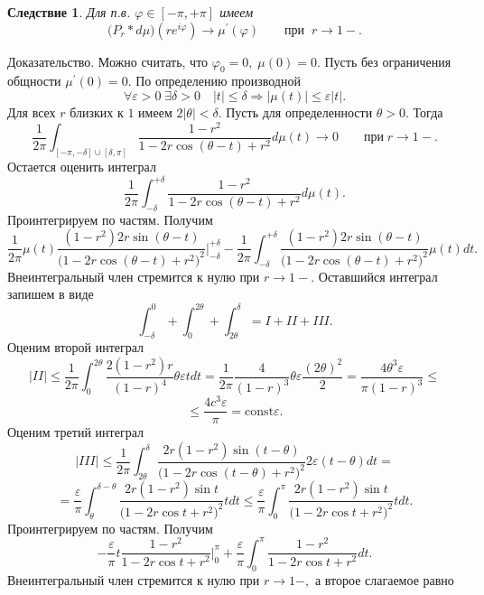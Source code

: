 \documentclass[12pt,a4paper]{article}
\theoremstyle{plain}   \newtheorem{Pro}{Задача}
\newtheorem{Cor}{Следствие}
\begin{document}
\begin{Cor}
Для п.в.
$ \varphi \in [-\pi , +\pi ] $
имеем
$$
  \biggl ( P_r \ast d\mu \biggr )
  (re^{i\varphi}) \longrightarrow
  \mu ^{\prime}(\varphi )
  \qquad при \; \; r \rightarrow 1- .
$$
\end{Cor}
{\Large Доказательство.}
Можно считать, что
$ \varphi _0 =0, \; \mu (0)=0. $
Пусть без ограничения общности
$ \mu ^{\prime}(0)=0. $
По определению производной
$$
  \forall \varepsilon >0 \; \exists \delta >0 \quad
  |t| \leq \delta \Rightarrow
  |\mu (t)| \leq \varepsilon |t|.
$$
Для всех
$ r $
близких к
$ 1 $
имеем
$ 2|\theta |<\delta . $
Пусть для определенности
$ \theta >0. $
Тогда
$$
  \frac{1}{2\pi} \int _{[-\pi , -\delta ] \cup [\delta , \pi]}
  \frac{1-r^2}{1-2r\cos (\theta -t)+r^2}d\mu (t)
  \longrightarrow 0 \qquad при \; r \rightarrow 1-.
$$
Остается оценить интеграл
$$
  \frac{1}{2\pi}\int _{-\delta}^{+\delta}
  \frac{1-r^2}{1-2r\cos (\theta -t)+r^2}d\mu (t).
$$
Проинтегрируем по частям. Получим
$$
  \frac{1}{2\pi}\mu (t)
  \frac{(1-r^2 )2r \sin (\theta -t)}
  {\bigl (1-2r\cos (\theta -t)+r^2 \bigr )^2}
  \Biggr | _{-\delta}^{+\delta}-
  \frac{1}{2\pi}\int _{-\delta}^{+\delta}
  \frac{(1-r^2 )2r \sin (\theta -t)}
  {\bigl (1-2r\cos (\theta -t)+r^2 \bigr )^2}
  \mu (t)dt.
$$
Внеинтегральный член стремится к нулю при
$ r \rightarrow 1- .$
Оставшийся интеграл запишем в виде
$$
  \int _{-\delta}^0 + \int _0 ^{2\theta} +
  \int _{2\theta}^{\delta} = I +II +III.
$$
Оценим второй интеграл
$$
  |II| \leq \frac{1}{2\pi}\int _0 ^{2\theta}
  \frac{2(1-r^2 )r}{(1-r)^4}\theta \varepsilon tdt=
  \frac{1}{2\pi}\frac{4}{(1-r)^3}\theta \varepsilon
  \frac{(2\theta)^2}{2}=
  \frac{4\theta ^3 \varepsilon}{\pi (1-r)^3} \leq
$$
$$
  \leq \frac{4c^3 \varepsilon }{\pi} = \mathrm{const} \varepsilon .
$$
Оценим третий интеграл
$$
  |III| \leq \frac{1}{2\pi} \int _{2\theta}^{\delta}
  \frac{2r(1-r^2 ) \sin (t-\theta )}
  {\bigl ( 1-2r \cos (t-\theta ) +r^2 \bigr ) ^2}
  2\varepsilon (t-\theta )dt=
$$
$$
  =\frac{\varepsilon}{\pi}\int _{\theta}^{\delta -\theta}
  \frac{2r(1-r^2 )\sin t}{\bigl (1-2r\cos t +r^2 \bigr ) ^2}tdt
  \leq \frac{\varepsilon}{\pi}\int _0 ^{\pi}
  \frac{2r(1-r^2 ) \sin t}
  {\bigl ( 1-2r\cos t +r^2 \bigr ) ^2}tdt.
$$
Проинтегрируем по частям. Получим
$$
  -\frac{\varepsilon}{\pi}t
  \frac{1-r^2}{1-2r\cos t +r^2 }
  \Biggr | _0 ^{\pi} + \frac{\varepsilon}{\pi}\int _0 ^{\pi}
  \frac{1-r^2}{1-2r\cos t +r^2 }dt.
$$
Внеинтегральный член стремится к нулю при
$ r \rightarrow 1- , $
а второе слагаемое равно
\end{document}

